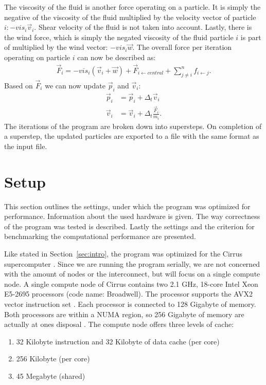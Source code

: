 \documentclass[twoside,11pt]{article}
\begin{document}
The viscosity of the fluid is another force operating on a particle.
It is simply the negative of the viscosity of the fluid multiplied
by the velocity vector of particle $i: -vis_i \vec{v}_i$.
Shear velocity of the fluid is not taken into account.
Lastly, there is the wind force, which is simply the negated viscosity
of the fluid particle $i$ is part of multiplied by the wind vector:
$-vis_i \vec{w}$.
The overall force per iteration operating on particle $i$ can now
be described as:
\begin{align}
  \label{eq:F_all}
  \vec{F}_i = -vis_i(\vec{v}_i + \vec{w}) +
              \vec{F}_{i \leftarrow central} +
              \sum_{j\neq i}^n f_{i \leftarrow j}.
\end{align}
Based on $\vec{F}_i$ we can now update $\vec{p}_i$ and $\vec{v}_i$:
\begin{align}
  \label{eq:p}
  \vec{p}_i &= \vec{p}_i + \Delta_t \vec{v}_i \\
  \label{eq:v}
  \vec{v}_i &= \vec{v}_i + \Delta_t \frac{\vec{F}_i}{m_i}.
\end{align}
The iterations of the program are broken down into supersteps.
On completion of a superstep, the updated particles are exported to a
file with the same format as the input file.


\section{Setup} %
\label{sec:setup}

This section outlines the settings, under which the program was
optimized for performance. Information about the used hardware is
given.
The way correctness of the program was tested is described.
Lastly the settings and the criterion for benchmarking the
computational performance are presented.

Like stated in Section~\ref{sec:intro}, the program was optimized for
the Cirrus supercomputer \citep{cirrus}.
Since we are running the program serially, we are not concerned with
the amount of nodes or the interconnect, but will focus on a single
compute node.
A single compute node of Cirrus contains two 2.1 GHz, 18-core Intel
Xeon E5-2695 processors (code name: Broadwell).
The processor supports the AVX2 vector instruction set \citep{avx2}.
Each processor is connected to 128 Gigabyte of memory.
Both processors are within a NUMA region, so 256 Gigabyte of memory
are actually at ones disposal \citep{cirrus_hardware}.
The compute node offers three levels of cache:
\begin{enumerate}
  \item 32 Kilobyte instruction and 32 Kilobyte of data cache
        (per core)
  \item 256 Kilobyte (per core)
  \item 45 Megabyte (shared)
\end{enumerate}
\end{document}
